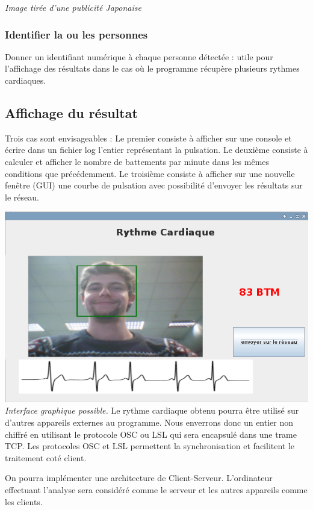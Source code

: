\documentclass[12pt,a4paper]{article}
\begin{document}
\textit{Image tirée d'une publicité Japonaise
}
\subsubsection{Identifier la ou les personnes}

Donner un identifiant numérique à chaque personne détectée : utile pour l'affichage des résultats dans le cas où le programme récupère plusieurs rythmes cardiaques.


\subsection{Affichage du résultat}

Trois cas sont envisageables : Le premier consiste à afficher sur une console et écrire dans un fichier log l'entier représentant la pulsation.
Le deuxième consiste à calculer et afficher le nombre de battements par minute dans les mêmes conditions que précédemment. Le troisième consiste à afficher sur une nouvelle fenêtre (GUI) une courbe de pulsation avec possibilité d'envoyer les résultats sur le réseau.\newline

 \includegraphics[scale=0.5]{gui.png}
\textit{Interface graphique possible.}
\newpage
Le rythme cardiaque obtenu pourra être utilisé sur d'autres appareils externes au programme. 
Nous enverrons donc un entier non chiffré en utilisant le protocole OSC ou LSL qui sera encapsulé dans une trame TCP. Les protocoles OSC et LSL permettent la synchronisation et facilitent le traitement coté client.

On pourra implémenter une architecture de Client-Serveur. L'ordinateur effectuant l'analyse sera considéré comme le serveur et les autres appareils comme les clients.
\end{document}
